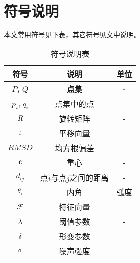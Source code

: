 \section{符号说明}
本文常用符号见下表，其它符号见文中说明。

\begingroup %
\setlength{\heavyrulewidth}{2.5pt} %

\begin{table}[H]
\centering
\caption{符号说明表}
\begin{tabularx}{\textwidth}{CCC}
\toprule %
\textbf{符号}    & \textbf{说明}    & \textbf{单位} \\
\midrule %
\textbf{$P$, $Q$} & \textbf{点集} & \textbf{-} \\
$p_i$, $q_i$ & 点集中的点 & - \\
$R$ & 旋转矩阵 & - \\
$t$ & 平移向量 & - \\
$RMSD$ & 均方根偏差 & - \\
$\mathbf{c}$ & 重心 & - \\
$d_{ij}$ & 点$i$与点$j$之间的距离 & - \\
$\theta_i$ & 内角 & 弧度 \\
$\mathcal{F}$ & 特征向量 & - \\
$\lambda$ & 阈值参数 & - \\
$\delta$ & 形变参数 & - \\
$\sigma$ & 噪声强度 & - \\
\bottomrule %
\end{tabularx}
\label{tab:符号说明}
\end{table}

\endgroup %